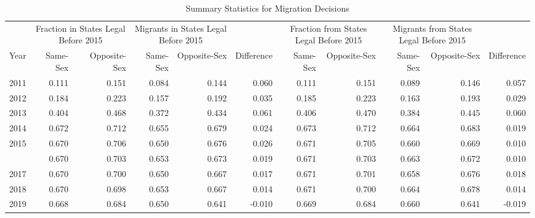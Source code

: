 \begin{table}

\caption{Summary Statistics for Migration Decisions}
\centering
\begin{tabular}[t]{rrrrrrrrrrr}
\toprule
\multicolumn{1}{c}{ } & \multicolumn{2}{c}{Fraction in States Legal Before 2015} & \multicolumn{2}{c}{Migrants in States Legal Before 2015} & \multicolumn{1}{c}{ } & \multicolumn{2}{c}{Fraction from States Legal Before 2015} & \multicolumn{2}{c}{Migrants from States Legal Before 2015} & \multicolumn{1}{c}{ } \\
\cmidrule(l{3pt}r{3pt}){2-3} \cmidrule(l{3pt}r{3pt}){4-5} \cmidrule(l{3pt}r{3pt}){7-8} \cmidrule(l{3pt}r{3pt}){9-10}
Year & Same-Sex & Opposite-Sex & Same-Sex & Opposite-Sex & Difference & Same-Sex & Opposite-Sex & Same-Sex & Opposite-Sex & Difference\\
\midrule
2011 & 0.111 & 0.151 & 0.084 & 0.144 & 0.060 & 0.111 & 0.151 & 0.089 & 0.146 & 0.057\\
2012 & 0.184 & 0.223 & 0.157 & 0.192 & 0.035 & 0.185 & 0.223 & 0.163 & 0.193 & 0.029\\
2013 & 0.404 & 0.468 & 0.372 & 0.434 & 0.061 & 0.406 & 0.470 & 0.384 & 0.445 & 0.060\\
2014 & 0.672 & 0.712 & 0.655 & 0.679 & 0.024 & 0.673 & 0.712 & 0.664 & 0.683 & 0.019\\
2015 & 0.670 & 0.706 & 0.650 & 0.676 & 0.026 & 0.671 & 0.705 & 0.660 & 0.669 & 0.010\\
\addlinespace
2016 & 0.670 & 0.703 & 0.653 & 0.673 & 0.019 & 0.671 & 0.703 & 0.663 & 0.672 & 0.010\\
2017 & 0.670 & 0.700 & 0.650 & 0.667 & 0.017 & 0.671 & 0.701 & 0.658 & 0.676 & 0.018\\
2018 & 0.670 & 0.698 & 0.653 & 0.667 & 0.014 & 0.671 & 0.700 & 0.664 & 0.678 & 0.014\\
2019 & 0.668 & 0.684 & 0.650 & 0.641 & -0.010 & 0.669 & 0.684 & 0.660 & 0.641 & -0.019\\
\bottomrule
\end{tabular}
\end{table}
